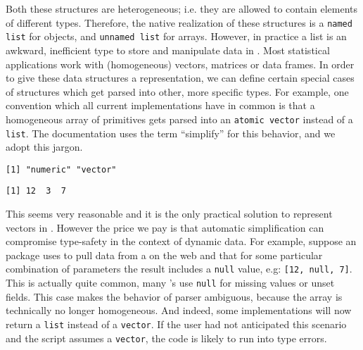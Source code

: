 \noindent Both these structures are heterogeneous; i.e. they are allowed to contain elements of different types. Therefore, the native \R realization of these structures is a \texttt{named list} for \JSON objects, and \texttt{unnamed list} for \JSON arrays. However, in practice a list is an awkward, inefficient type to store and manipulate data in \R.  Most statistical applications work with (homogeneous) vectors, matrices or data frames. In order to give these data structures a \JSON representation, we can define certain special cases of \JSON structures which get parsed into other, more specific \R types. For example, one convention which all current implementations have in common is that a homogeneous array of primitives gets parsed into an \texttt{atomic vector} instead of a \texttt{list}. The  documentation uses the term ``simplify'' for this behavior, and we adopt this jargon.

\begin{knitrout}\mycodesize
{}\color{fgcolor}\begin{kframe}
\begin{alltt}
 \hlkwb{<-} 
 \hlkwb{<-} 
\end{alltt}
\begin{verbatim}
[1] "numeric" "vector" 
\end{verbatim}
\begin{alltt}
\end{alltt}
\begin{verbatim}
[1] 12  3  7
\end{verbatim}
\end{kframe}
\end{knitrout}

 
This seems very reasonable and it is the only practical solution to represent vectors in \JSON. However the price we pay is that automatic simplification can compromise type-safety in the context of dynamic data. For example, suppose an \R package uses \fromJSON to pull data from a \JSON \API on the web and that for some particular combination of parameters the result includes a \texttt{null} value, e.g: \texttt{[12, null, 7]}. This is actually quite common, many \API's use \texttt{null} for missing values or unset fields. This case makes the behavior of parser ambiguous, because the \JSON array is technically no longer homogeneous. And indeed, some implementations will now return a \texttt{list} instead of a \texttt{vector}. If the user had not anticipated this scenario and the script assumes a \texttt{vector}, the code is likely to run into type errors. 

